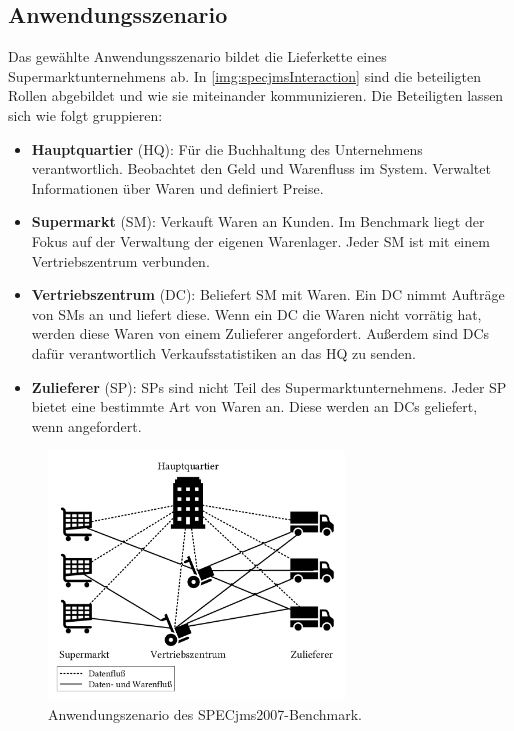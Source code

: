 \subsection{Anwendungsszenario}
Das gewählte Anwendungsszenario bildet die Lieferkette eines Supermarktunternehmens ab. In \autoref{img:specjmsInteraction} sind die beteiligten Rollen abgebildet und wie sie miteinander kommunizieren. Die Beteiligten lassen sich wie folgt gruppieren: 
\begin{itemize}
    \item \textbf{Hauptquartier} (HQ): Für die Buchhaltung des Unternehmens verantwortlich. Beobachtet den Geld und Warenfluss im System. Verwaltet Informationen über Waren und definiert Preise.
    \item \textbf{Supermarkt} (SM): Verkauft Waren an Kunden. Im Benchmark liegt der Fokus auf der Verwaltung der eigenen Warenlager. Jeder SM ist mit einem Vertriebszentrum verbunden.
    \item \textbf{Vertriebszentrum} (DC): Beliefert SM mit Waren. Ein DC nimmt Aufträge von SMs an und liefert diese. Wenn ein DC die Waren nicht vorrätig hat, werden diese Waren von einem Zulieferer angefordert. Außerdem sind DCs dafür verantwortlich Verkaufsstatistiken an das HQ zu senden.
    \item \textbf{Zulieferer} (SP): SPs sind nicht Teil des Supermarktunternehmens. Jeder SP bietet eine bestimmte Art von Waren an. Diese werden an DCs geliefert, wenn angefordert.
\end{itemize}

\begin{figure}
\center
  \includegraphics[width=0.7\textwidth]{images/evaluation/specjms/specjmsOverview.pdf}
  \caption{Anwendungszenario des SPECjms2007-Benchmark.}
  \label{img:specjmsInteraction}
\end{figure}

